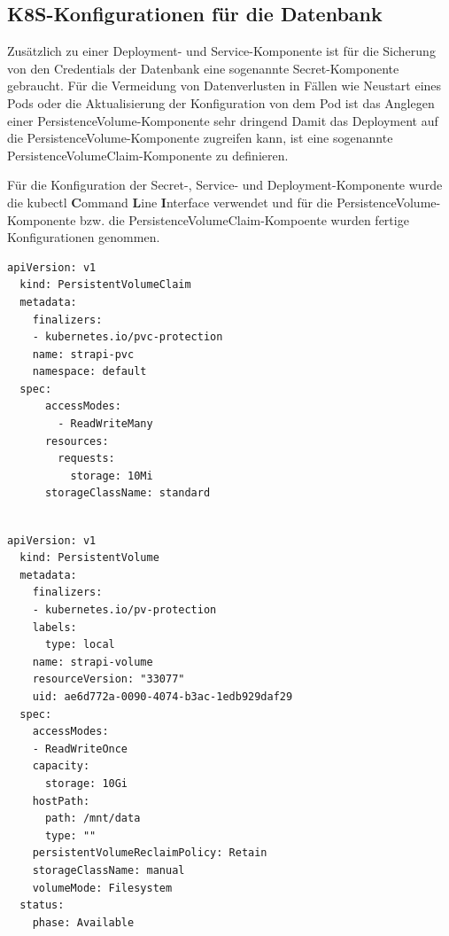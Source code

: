 \subsection{K8S-Konfigurationen für die Datenbank}
Zusätzlich zu einer Deployment- und Service-Komponente ist für die Sicherung
von den Credentials der Datenbank eine sogenannte
Secret-Komponente gebraucht.
Für die Vermeidung von Datenverlusten in Fällen
wie Neustart eines Pods oder die Aktualisierung
der Konfiguration von dem Pod ist
das Anglegen einer PersistenceVolume-Komponente sehr dringend
Damit das Deployment auf die PersistenceVolume-Komponente zugreifen kann, ist eine sogenannte PersistenceVolumeClaim-Komponente zu definieren.

Für die Konfiguration der Secret-, Service- und Deployment-Komponente wurde die kubectl \textbf{C}ommand \textbf{L}ine \textbf{I}nterface verwendet
und für die PersistenceVolume-Komponente bzw. die PersistenceVolumeClaim-Kompoente wurden fertige Konfigurationen genommen.
\begin{lstlisting}[caption=K8S PVC]
  apiVersion: v1
  kind: PersistentVolumeClaim
  metadata:
    finalizers:
    - kubernetes.io/pvc-protection
    name: strapi-pvc
    namespace: default
  spec:
      accessModes:
        - ReadWriteMany
      resources:
        requests:
          storage: 10Mi
      storageClassName: standard
    
\end{lstlisting}


\begin{lstlisting}[caption=K8S PV]
  apiVersion: v1
  kind: PersistentVolume
  metadata:
    finalizers:
    - kubernetes.io/pv-protection
    labels:
      type: local
    name: strapi-volume
    resourceVersion: "33077"
    uid: ae6d772a-0090-4074-b3ac-1edb929daf29
  spec:
    accessModes:
    - ReadWriteOnce
    capacity:
      storage: 10Gi
    hostPath:
      path: /mnt/data
      type: ""
    persistentVolumeReclaimPolicy: Retain
    storageClassName: manual
    volumeMode: Filesystem
  status:
    phase: Available
    
\end{lstlisting}



